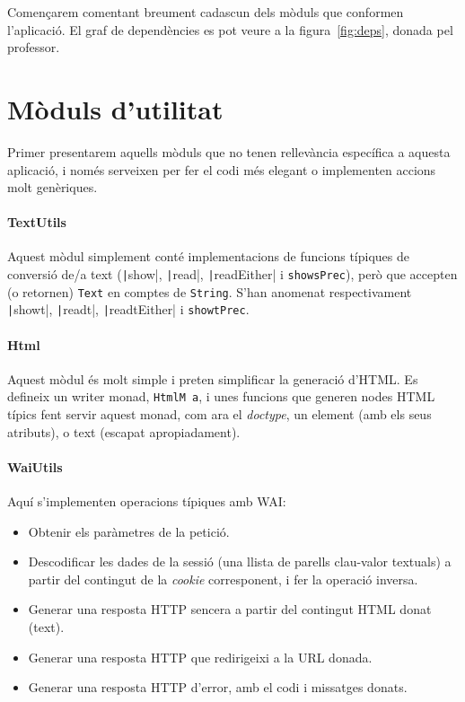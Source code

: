 \documentclass[catalan, a4paper]{scrartcl}
\begin{document}
Començarem comentant breument cadascun dels mòduls que conformen l'aplicació.
El graf de dependències es pot veure a la figura~\ref{fig:deps}, donada pel professor.

\section{Mòduls d'utilitat}

Primer presentarem aquells mòduls que no tenen rellevància específica
a aquesta aplicació, i només serveixen per fer el codi més elegant o
implementen accions molt genèriques.

\paragraph{TextUtils} Aquest mòdul simplement conté implementacions de funcions
típiques de conversió de/a text (\texttt|show|, \texttt|read|,
\texttt|readEither| i \texttt{showsPrec}), però
que accepten (o retornen) \texttt{Text} en comptes de \texttt{String}.
S'han anomenat respectivament \texttt|showt|, \texttt|readt|,
\texttt|readtEither| i \texttt{showtPrec}.

\paragraph{Html} Aquest mòdul és molt simple i preten simplificar la generació d'HTML.
Es defineix un writer monad, \texttt{HtmlM a},
i unes funcions que generen nodes HTML típics fent servir aquest monad, com
ara el \emph{doctype}, un element (amb els seus atributs), o text (escapat apropiadament).

\paragraph{WaiUtils} Aquí s'implementen operacions típiques amb WAI:

\begin{itemize}
  \item Obtenir els paràmetres de la petició.
  \item Descodificar les dades de la sessió (una llista de parells clau-valor textuals) a
        partir del contingut de la \emph{cookie} corresponent, i fer la operació inversa.
  \item Generar una resposta HTTP sencera a partir del contingut HTML donat (text).
  \item Generar una resposta HTTP que redirigeixi a la URL donada.
  \item Generar una resposta HTTP d'error, amb el codi i missatges donats.
\end{itemize}
\end{document}
